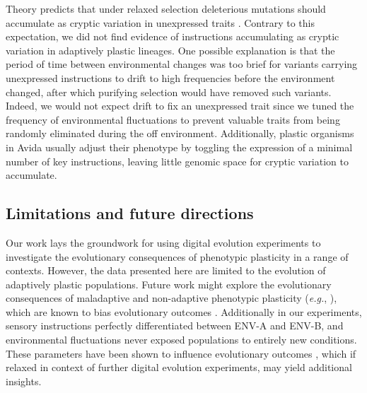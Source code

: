 Theory predicts that under relaxed selection deleterious mutations should accumulate as cryptic variation in unexpressed traits \citep{lahti_relaxed_2009}.
Contrary to this expectation, we did not find evidence of  instructions accumulating as cryptic variation in adaptively plastic lineages.
One possible explanation is that the period of time between environmental changes was too brief for variants carrying unexpressed  instructions to drift to high frequencies before the environment changed, after which purifying selection would have removed such variants.
Indeed, we would not expect drift to fix an unexpressed trait since we tuned the frequency of environmental fluctuations to prevent valuable traits from being randomly eliminated during the off environment.
Additionally, plastic organisms in Avida usually adjust their phenotype by toggling the expression of a minimal number of key instructions, leaving little genomic space for cryptic variation to accumulate.

\subsection{Limitations and future directions}


Our work lays the groundwork for using digital evolution experiments to investigate the evolutionary consequences of phenotypic plasticity in a range of contexts.
However, the data presented here are limited to the evolution of adaptively plastic populations.
Future work might explore the evolutionary consequences of maladaptive and non-adaptive phenotypic plasticity (\textit{e.g.}, \citealt{leroi_temperature_1994}), which are known to bias evolutionary outcomes \citep{ghalambor_non-adaptive_2015}. 
Additionally in our experiments, sensory instructions perfectly differentiated between ENV-A and ENV-B, and environmental fluctuations never exposed populations to entirely new conditions.
These parameters have been shown to influence evolutionary outcomes \citep{li_digital_2004,boyer_adaptation_2021}, which if relaxed in context of further digital evolution experiments, may yield additional insights.


